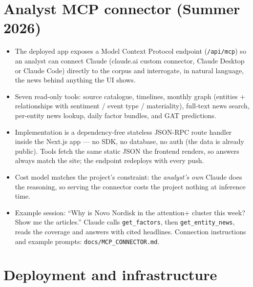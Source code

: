 \documentclass[11pt]{article}
\begin{document}
\section{Analyst MCP connector (Summer 2026)}
\label{sec:mcp}

\begin{itemize}
  \item The deployed app exposes a Model Context Protocol endpoint (\texttt{/api/mcp}) so an analyst can connect Claude (claude.ai custom connector, Claude Desktop or Claude Code) directly to the corpus and interrogate, in natural language, the news behind anything the UI shows.
  \item Seven read-only tools: source catalogue, timelines, monthly graph (entities + relationships with sentiment / event type / materiality), full-text news search, per-entity news lookup, daily factor bundles, and GAT predictions.
  \item Implementation is a dependency-free stateless JSON-RPC route handler inside the Next.js app --- no SDK, no database, no auth (the data is already public). Tools fetch the same static JSON the frontend renders, so answers always match the site; the endpoint redeploys with every push.
  \item Cost model matches the project's constraint: the \emph{analyst's own} Claude does the reasoning, so serving the connector costs the project nothing at inference time.
  \item Example session: ``Why is Novo Nordisk in the attention+ cluster this week? Show me the articles.'' Claude calls \texttt{get\_factors}, then \texttt{get\_entity\_news}, reads the coverage and answers with cited headlines. Connection instructions and example prompts: \texttt{docs/MCP\_CONNECTOR.md}.
\end{itemize}

\section{Deployment and infrastructure}
\end{document}
